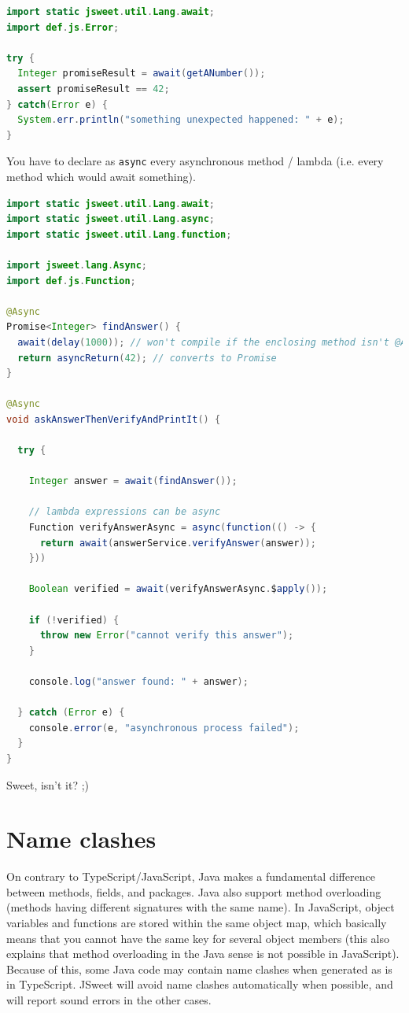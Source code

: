 \documentclass[a4paper]{report}
\begin{document}
\begin{lstlisting}[language=Java]
import static jsweet.util.Lang.await;
import def.js.Error;

try {
  Integer promiseResult = await(getANumber());
  assert promiseResult == 42;
} catch(Error e) {
  System.err.println("something unexpected happened: " + e);
}

\end{lstlisting}

You have to declare as \texttt{async} every asynchronous method / lambda (i.e. every method which would await something).

\begin{lstlisting}[language=Java]
import static jsweet.util.Lang.await;
import static jsweet.util.Lang.async;
import static jsweet.util.Lang.function;

import jsweet.lang.Async;
import def.js.Function;

@Async
Promise<Integer> findAnswer() {
  await(delay(1000)); // won't compile if the enclosing method isn't @Async
  return asyncReturn(42); // converts to Promise
}

@Async
void askAnswerThenVerifyAndPrintIt() {
  
  try {

    Integer answer = await(findAnswer());

    // lambda expressions can be async
    Function verifyAnswerAsync = async(function(() -> {
      return await(answerService.verifyAnswer(answer));
    }))

    Boolean verified = await(verifyAnswerAsync.$apply());

    if (!verified) {
      throw new Error("cannot verify this answer");
    }

    console.log("answer found: " + answer);

  } catch (Error e) {
    console.error(e, "asynchronous process failed");
  }
}

\end{lstlisting}

Sweet, isn't it? ;)

\section{Name clashes}

On contrary to TypeScript/JavaScript, Java makes a fundamental difference between methods, fields, and packages. Java also support method overloading (methods having different signatures with the same name). In JavaScript, object variables and functions are stored within the same object map, which basically means that you cannot have the same key for several object members (this also explains that method overloading in the Java sense is not possible in JavaScript). Because of this, some Java code may contain name clashes when generated as is in TypeScript. JSweet will avoid name clashes automatically when possible, and will report sound errors in the other cases.
\end{document}
